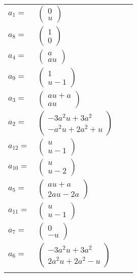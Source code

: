 \documentclass[1p]{elsarticle_modified}
\theoremstyle{definition}
\begin{document}
\begin{tabular}{m{7pt} m{180pt} m{7pt} m{180pt} }
\flushright $a_{1}=$&$\begin{pmatrix}0\\u\end{pmatrix}$ \\
\flushright $a_{8}=$&$\begin{pmatrix}1\\0\end{pmatrix}$ \\
\flushright $a_{4}=$&$\begin{pmatrix}a\\a u\end{pmatrix}$ \\
\flushright $a_{9}=$&$\begin{pmatrix}1\\u-1\end{pmatrix}$ \\
\flushright $a_{3}=$&$\begin{pmatrix}a u+a\\a u\end{pmatrix}$ \\
\flushright $a_{2}=$&$\begin{pmatrix}-3 a^2 u+3 a^2\\- a^2 u+2 a^2+u\end{pmatrix}$ \\
\flushright $a_{12}=$&$\begin{pmatrix}u\\u-1\end{pmatrix}$ \\
\flushright $a_{10}=$&$\begin{pmatrix}u\\u-2\end{pmatrix}$ \\
\flushright $a_{5}=$&$\begin{pmatrix}a u+a\\2 a u-2 a\end{pmatrix}$ \\
\flushright $a_{11}=$&$\begin{pmatrix}u\\u-1\end{pmatrix}$ \\
\flushright $a_{7}=$&$\begin{pmatrix}0\\- u\end{pmatrix}$ \\
\flushright $a_{6}=$&$\begin{pmatrix}-3 a^2 u+3 a^2\\2 a^2 u+2 a^2- u\end{pmatrix}$\\&\end{tabular}
\end{document}
